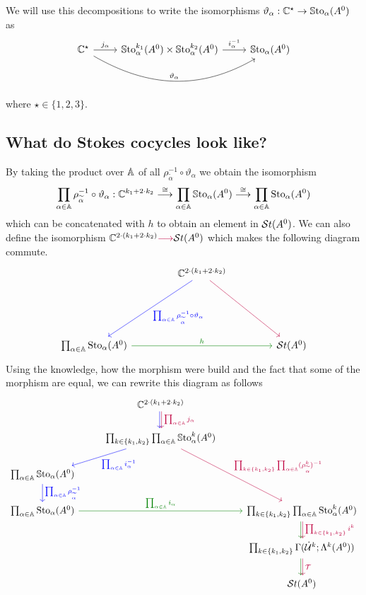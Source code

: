 We will use this decompositions to write the isomorphisms
$\vartheta_\alpha:\mathbb{C}^\star\to \operatorname{\mathbb{S}to}_\alpha(A^0)$ as
\[ \begin{tikzcd}
  \C^\star
  \rar{j_\alpha}
  \arrow[rr,out=-30,in=-150,"\vartheta_\alpha"]
  &
  \SSto_\alpha^{k_1}(A^0)\times\SSto_\alpha^{k_2}(A^0)
  \rar{i_\alpha^{-1}}
  &
  \SSto_\alpha(A^0)
\end{tikzcd} \]
where $\star\in\{1,2,3\}$.

\subsection{What do Stokes cocycles look like?}
\begin{prop}\label{prop:decompositionDiagram}
  By taking the product over $\mathbb{A}$ of all
  $\rho_{\tilde\alpha}^{-1}\circ\vartheta_\alpha$ we obtain the isomorphism
  \[
    \prod_{\alpha\in\mathbb{A}}\rho_{\widetilde\alpha}^{-1}\circ\vartheta_\alpha:
    \mathbb{C}^{k_1+2\cdot k_2}
    \overset\cong\longrightarrow \prod_{\alpha\in\mathbb{A}}\operatorname{\mathbb{S}to}_\alpha(A^0)
    \overset\cong\longrightarrow \prod_{\alpha\in\mathbb{A}}\operatorname{Sto}_\alpha(A^0)
  \]
  which can be concatenated with $h$ to obtain an element in $\mathcal{S}{}t(A^0)$.
  We can also define the isomorphism
  $\mathbb{C}^{2\cdot(k_1+2\cdot k_2)}\textcolor{purple}{\longrightarrow} \mathcal{S}{}t(A^0)$
  which makes the following diagram commute.
  \[ \begin{tikzcd}[column sep=1.5cm,row sep=2cm]
      &\C^{2\cdot(k_1+2\cdot k_2)}
      \dlar[blue]{\prod_{\alpha\in\A}\rho_{\tilde\alpha}^{-1}\circ\vartheta_\alpha}
      \arrow[dr,purple]
    \\\prod_{\alpha\in\A}\Sto_\alpha(A^0)
      \arrow[rr,green!50!black,"h"]
      &&\St(A^0)
  \end{tikzcd} \]
  Using the knowledge, how the morphism were build and the fact that some of
  the morphism are equal, we can rewrite this diagram as follows
  \[ \begin{tikzcd}
      &\C^{2\cdot(k_1+2\cdot k_2)}
      \dar[xshift=-1pt,blue]
      \dar[xshift=1pt,purple,"\prod_{\alpha\in\A}j_\alpha"]
    \\
      &\prod_{k\in\{k_1,k_2\}}\prod_{\alpha\in\A}\SSto_{\alpha}^{k}(A^0)
       \arrow[dl,blue,"\prod_{\alpha\in\A}i_\alpha^{-1}"]
       \arrow[ddr,purple,
         "\prod_{k\in\{k_1,k_2\}}\prod_{\alpha\in\A}(\rho_{\tilde\alpha}^k)^{-1}"]
    \\ \prod_{\alpha\in\A} \SSto_{\alpha}(A^0)
        \dar[blue]{\prod_{\alpha\in\A}\rho_{\tilde\alpha}^{-1}}
    \\\prod_{\alpha\in\A} \Sto_{\alpha}(A^0)
      \arrow[rr,green!50!black,"\prod_{\alpha\in\A}i_\alpha"]
      &&\prod_{k\in\{k_1,k_2\}}\prod_{\alpha\in\A}\Sto_{\alpha}^{k}(A^0)
      \dar[xshift=-1pt,green!50!black]
      \dar[xshift=1pt,purple]{\prod_{k\in\{k_1,k_2\}}i^k}
    \\
      && \prod_{k\in\{k_1,k_2\}}\Gamma(\dot\cU^k;\Lambda^k(A^0))
      \dar[xshift=-1pt,green!50!black]
      \dar[xshift=1pt,purple]{\cT}
    \\&& \St(A^0)
  \end{tikzcd} \]
\end{prop}


